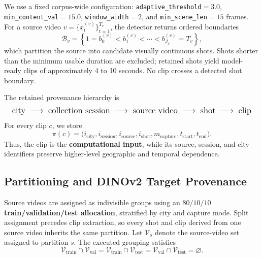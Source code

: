 We use a fixed corpus-wide configuration:
\texttt{adaptive\_threshold}$=3.0$,
\texttt{min\_content\_val}$=15.0$,
\texttt{window\_width}$=2$, and
\texttt{min\_scene\_len}$=15$ frames. For a source video
\(v=\{x^{(v)}_t\}_{t=1}^{T_v}\), the detector returns ordered
boundaries
\begin{equation*}
\mathcal B_v
=
\left\{
1=b^{(v)}_0
<
b^{(v)}_1
<
\cdots
<
b^{(v)}_{J_v}=T_v
\right\},
\end{equation*}
which partition the source into candidate visually continuous shots.
Shots shorter than the minimum usable duration are excluded; retained
shots yield model-ready clips of approximately 4 to 10 seconds.
No clip crosses a detected shot boundary.

The retained provenance hierarchy is
\begin{equation*}
\resizebox{0.98\columnwidth}{!}{$\displaystyle
\text{city}
\;\longrightarrow\;
\text{collection session}
\;\longrightarrow\;
\text{source video}
\;\longrightarrow\;
\text{shot}
\;\longrightarrow\;
\text{clip}
$}
\end{equation*}
For every clip \(c\), we store
\begin{equation*}
\pi(c)=
\bigl(
i_{\mathrm{city}},
i_{\mathrm{session}},
i_{\mathrm{source}},
i_{\mathrm{shot}},
m_{\mathrm{capture}},
t_{\mathrm{start}},
t_{\mathrm{end}}
\bigr).
\end{equation*}
Thus, the clip is the \textbf{computational input}, while its source,
session, and city identifiers preserve higher-level geographic and
temporal dependence.

\subsection{Partitioning and DINOv2 Target Provenance}
\label{app:dataset_splits}

Source videos are assigned as indivisible groups using an
\textbf{\(80/10/10\) train/validation/test allocation}, stratified by
city and capture mode. Split assignment precedes clip extraction, so
every shot and clip derived from one source video inherits the same
partition. Let \(\mathcal V_s\) denote the source-video set assigned to
partition \(s\). The executed grouping satisfies
\begin{equation*}
\mathcal V_{\mathrm{train}}\cap\mathcal V_{\mathrm{val}}
=
\mathcal V_{\mathrm{train}}\cap\mathcal V_{\mathrm{test}}
=
\mathcal V_{\mathrm{val}}\cap\mathcal V_{\mathrm{test}}
=
\varnothing.
\end{equation*}

